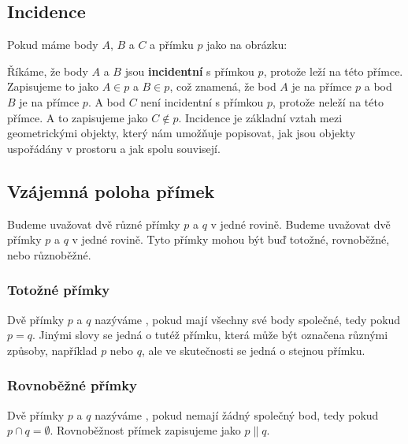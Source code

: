 \documentclass[12pt,a4paper]{article}
\begin{document}
\subsection{Incidence}
Pokud máme body $A$, $B$ a $C$ a přímku $p$ jako na obrázku:

\begin{center}
\end{center}
Říkáme, že body $A$ a $B$ jsou \textbf{incidentní} s přímkou $p$, protože leží na této přímce. 
Zapisujeme to jako $A \in p$ a $B \in p$, což znamená, že bod $A$ je na přímce $p$ a bod $B$ je na přímce $p$.
A bod $C$ není incidentní s přímkou $p$, protože neleží na této přímce. A to zapisujeme jako $C \notin p$.
Incidence je základní vztah mezi geometrickými objekty, který nám umožňuje popisovat, jak jsou objekty uspořádány v prostoru a jak spolu souvisejí.

\subsection{Vzájemná poloha přímek}
Budeme uvažovat dvě různé přímky $p$ a $q$ v jedné rovině. 
Budeme uvažovat dvě přímky $p$ a $q$ v jedné rovině.
Tyto přímky mohou být buď totožné, rovnoběžné, nebo různoběžné.

\subsubsection*{Totožné přímky}
Dvě přímky $p$ a $q$ nazýváme , 
pokud mají všechny své body společné, tedy pokud $p = q$.
Jinými slovy se jedná o tutéž přímku, která může být označena různými způsoby, například $p$ nebo $q$, ale ve skutečnosti se jedná o stejnou přímku.

\begin{center}
\end{center}

\subsubsection*{Rovnoběžné přímky}
Dvě přímky $p$ a $q$ nazýváme , 
pokud nemají žádný společný bod, tedy pokud $p \cap q = \emptyset$.
Rovnoběžnost přímek zapisujeme jako $p \parallel q$.
\end{document}
